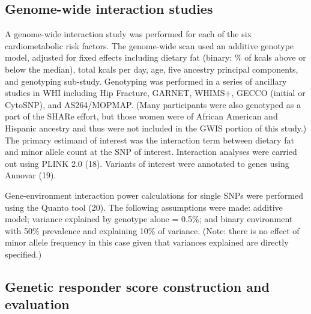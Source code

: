 \documentclass[]{article}
\begin{document}
\hypertarget{genome-wide-interaction-studies}{%
\subsection{Genome-wide interaction
studies}\label{genome-wide-interaction-studies}}

A genome-wide interaction study was performed for each of the six
cardiometabolic risk factors. The genome-wide scan used an additive
genotype model, adjusted for fixed effects including dietary fat
(binary: \% of kcals above or below the median), total kcals per day,
age, five ancestry principal components, and genotyping sub-study.
Genotyping was performed in a series of ancillary studies in WHI
including Hip Fracture, GARNET, WHIMS+, GECCO (initial or CytoSNP), and
AS264/MOPMAP. (Many participants were also genotyped as a part of the
SHARe effort, but those women were of African American and Hispanic
ancestry and thus were not included in the GWIS portion of this study.)
The primary estimand of interest was the interaction term between
dietary fat and minor allele count at the SNP of interest. Interaction
analyses were carried out using PLINK 2.0 (18). Variants of interest
were annotated to genes using Annovar (19).

Gene-environment interaction power calculations for single SNPs were
performed using the Quanto tool (20). The following assumptions were
made: additive model; variance explained by genotype alone = 0.5\%; and
binary environment with 50\% prevalence and explaining 10\% of variance.
(Note: there is no effect of minor allele frequency in this case given
that variances explained are directly specified.)

\hypertarget{genetic-responder-score-construction-and-evaluation}{%
\subsection{Genetic responder score construction and
evaluation}\label{genetic-responder-score-construction-and-evaluation}}
\end{document}
